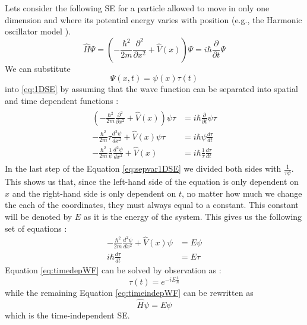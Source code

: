 \documentclass[../master_thesis.tex]{subfiles}
\begin{document}
Lets consider the following \ac{SE} for a particle allowed to move in only one dimension
and where its potential energy varies with position (e.g., the Harmonic oscillator
model \cite{Cohen:1973, Atkins:2014}).
\begin{equation}
  \hat{H}\Psi = \left(-\frac{\hbar^2}{2m}\frac{\partial^2 }{\partial x^2} + \hat{V}(x)\right)\Psi = i\hbar\frac{\partial}{\partial t} \Psi\label{eq:1DSE}
\end{equation}
We can substitute $$\Psi(x, t)=\psi(x)\tau(t)$$ into \ref{eq:1DSE}
by assuming that the wave function can be separated into spatial and time dependent
functions \cite{Atkins:2011}:
\begin{align}
  \begin{split}\label{eq:sepvar1DSE}
    \left(-\frac{\hbar^2}{2m}\frac{\partial^2 }{\partial x^2} + \hat{V}(x)\right)\psi\tau &= i\hbar\frac{\partial}{\partial t} \psi\tau \\
    -\frac{\hbar^2}{2m}\tau\frac{d^2 \psi}{d x^2} + \hat{V}(x)\psi\tau &= i\hbar\psi\frac{d\tau}{d t}\\
    -\frac{\hbar^2}{2m}\frac{1}{\psi}\frac{d^2\psi }{d x^2} + \hat{V}(x) &= i\hbar\frac{1}{\tau}\frac{d\tau}{d t}
  \end{split}
\end{align}
In the last step of the Equation \ref{eq:sepvar1DSE} we divided both sides with $\frac{1}{\tau\psi}$.
This shows us that, since the left-hand side of the equation is only dependent on $x$ and the right-hand
side is only dependent on $t$, no matter how much we change the each of the coordinates, they must always equal to
a constant. This constant will be denoted by $E$ as it is the energy of the system. This gives us the following set of equations \cite{Atkins:2011}:
\begin{subequations}
  \label{eq:sysSE}
  \begin{align}
    -\frac{\hbar^2}{2m}\frac{d^2\psi}{d x^2} + \hat{V}(x)\psi &= E\psi  \label{eq:timeindepWF}\\
    i\hbar\frac{d\tau}{d t} &= E\tau  \label{eq:timedepWF}
  \end{align}
\end{subequations}
Equation \ref{eq:timedepWF} can be solved by observation as \cite{Atkins:2011, Cohen:1973} :
\begin{equation}
  \tau(t) = e^{-iE\frac{t}{\hbar}}
\end{equation}
while the remaining Equation \ref{eq:timeindepWF} can be rewritten as
\begin{equation}
  \hat{H}\psi = E\psi\label{eq:timeindepSE}
\end{equation}
which is the time-independent \ac{SE}.
\end{document}
